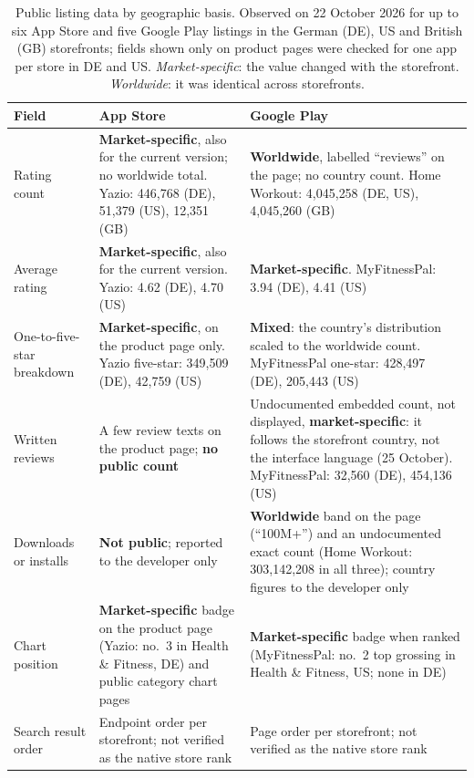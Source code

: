 \begin{table}[H]
\centering
\begin{singlespace}
\caption[Public listing data by geographic basis]{Public listing data by geographic basis. Observed on 22 October 2026
for up to six App Store and five Google Play listings in the German (DE), US
and British (GB) storefronts; fields shown only on product pages were checked
for one app per store in DE and US\@. \emph{Market-specific}: the value changed
with the storefront. \emph{Worldwide}: it was identical across storefronts.
}
\label{tab:storefront-fields}
\small
\setlength{\aboverulesep}{0.25ex}\setlength{\belowrulesep}{0.35ex}
\begin{tabularx}{\textwidth}{@{}>{\raggedright\arraybackslash}p{2.3cm}>{\raggedright\arraybackslash}X>{\raggedright\arraybackslash}X@{}}
\toprule
\textbf{Field} & \textbf{App Store} & \textbf{Google Play} \\
\midrule
Rating count & \textbf{Market-specific}, also for the current version; no
  worldwide total. Yazio: 446{,}768 (DE), 51{,}379 (US), 12{,}351 (GB)
  & \textbf{Worldwide}, labelled \enquote{reviews} on the page; no country
  count. Home Workout: 4{,}045{,}258 (DE, US), 4{,}045{,}260 (GB) \\
\midrule
Average rating & \textbf{Market-specific}, also for the current version.
  Yazio: 4.62 (DE), 4.70 (US)
  & \textbf{Market-specific}. MyFitnessPal: 3.94 (DE), 4.41 (US) \\
\midrule
One-to-five-star breakdown & \textbf{Market-specific}, on the product page
  only. Yazio five-star: 349{,}509 (DE), 42{,}759 (US)
  & \textbf{Mixed}: the country's distribution scaled to the worldwide count.
  MyFitnessPal one-star: 428{,}497 (DE), 205{,}443 (US) \\
\midrule
Written reviews & A few review texts on the product page; \textbf{no public
  count}
  & Undocumented embedded count, not displayed, \textbf{market-specific}: it
  follows the storefront country, not the interface language (25 October).
  MyFitnessPal: 32{,}560 (DE), 454{,}136 (US) \\
\midrule
Downloads or installs & \textbf{Not public}; reported to the developer
  only~\parencite{apple2026acquisition}
  & \textbf{Worldwide} band on the page (\enquote{100M+}) and an
  undocumented exact count (Home Workout: 303{,}142{,}208 in all three);
  country figures to the developer only~\parencite{google2026playstatistics} \\
\midrule
Chart position & \textbf{Market-specific} badge on the product page (Yazio:
  no.~3 in Health \& Fitness, DE) and public category chart pages
  & \textbf{Market-specific} badge when ranked (MyFitnessPal: no.~2 top
  grossing in Health \& Fitness, US; none in DE) \\
\midrule
Search result order & Endpoint order per storefront; not verified as the
  native store rank
  & Page order per storefront; not verified as the native store rank \\
\bottomrule
\end{tabularx}
\end{singlespace}
\end{table}


